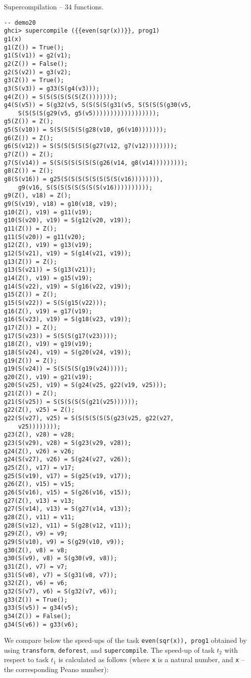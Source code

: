 Supercompilation -- 34 functions.
\begin{lstlisting}[style=demo,escapechar=!]
-- demo20
ghci> supercompile ({{even(sqr(x))}}, prog1)
g1(x)
g1(Z()) = True();
g1(S(v1)) = g2(v1);
g2(Z()) = False();
g2(S(v2)) = g3(v2);
g3(Z()) = True();
g3(S(v3)) = g33(S(g4(v3)));
g4(Z()) = S(S(S(S(S(S(Z()))))));
g4(S(v5)) = S(g32(v5, S(S(S(S(g31(v5, S(S(S(S(g30(v5, 
	S(S(S(S(g29(v5, g5(v5))))))))))))))))));
g5(Z()) = Z();
g5(S(v10)) = S(S(S(S(S(g28(v10, g6(v10)))))));
g6(Z()) = Z();
g6(S(v12)) = S(S(S(S(S(S(g27(v12, g7(v12))))))));
g7(Z()) = Z();
g7(S(v14)) = S(S(S(S(S(S(S(g26(v14, g8(v14)))))))));
g8(Z()) = Z();
g8(S(v16)) = g25(S(S(S(S(S(S(S(S(v16)))))))), 
	g9(v16, S(S(S(S(S(S(S(S(v16))))))))));
g9(Z(), v18) = Z();
g9(S(v19), v18) = g10(v18, v19);
g10(Z(), v19) = g11(v19);
g10(S(v20), v19) = S(g12(v20, v19));
g11(Z()) = Z();
g11(S(v20)) = g11(v20);
g12(Z(), v19) = g13(v19);
g12(S(v21), v19) = S(g14(v21, v19));
g13(Z()) = Z();
g13(S(v21)) = S(g13(v21));
g14(Z(), v19) = g15(v19);
g14(S(v22), v19) = S(g16(v22, v19));
g15(Z()) = Z();
g15(S(v22)) = S(S(g15(v22)));
g16(Z(), v19) = g17(v19);
g16(S(v23), v19) = S(g18(v23, v19));
g17(Z()) = Z();
g17(S(v23)) = S(S(S(g17(v23))));
g18(Z(), v19) = g19(v19);
g18(S(v24), v19) = S(g20(v24, v19));
g19(Z()) = Z();
g19(S(v24)) = S(S(S(S(g19(v24)))));
g20(Z(), v19) = g21(v19);
g20(S(v25), v19) = S(g24(v25, g22(v19, v25)));
g21(Z()) = Z();
g21(S(v25)) = S(S(S(S(S(g21(v25))))));
g22(Z(), v25) = Z();
g22(S(v27), v25) = S(S(S(S(S(S(g23(v25, g22(v27, 
	v25))))))));
g23(Z(), v28) = v28;
g23(S(v29), v28) = S(g23(v29, v28));
g24(Z(), v26) = v26;
g24(S(v27), v26) = S(g24(v27, v26));
g25(Z(), v17) = v17;
g25(S(v19), v17) = S(g25(v19, v17));
g26(Z(), v15) = v15;
g26(S(v16), v15) = S(g26(v16, v15));
g27(Z(), v13) = v13;
g27(S(v14), v13) = S(g27(v14, v13));
g28(Z(), v11) = v11;
g28(S(v12), v11) = S(g28(v12, v11));
g29(Z(), v9) = v9;
g29(S(v10), v9) = S(g29(v10, v9));
g30(Z(), v8) = v8;
g30(S(v9), v8) = S(g30(v9, v8));
g31(Z(), v7) = v7;
g31(S(v8), v7) = S(g31(v8, v7));
g32(Z(), v6) = v6;
g32(S(v7), v6) = S(g32(v7, v6));
g33(Z()) = True();
g33(S(v5)) = g34(v5);
g34(Z()) = False();
g34(S(v6)) = g33(v6);
\end{lstlisting}

We compare below the speed-ups of the task \texttt{{\color{brown}even(sqr(x))}, prog1}
obtained by using \texttt{transform}, \texttt{deforest}, and \texttt{supercompile}.
The speed-up of task $t_2$ with respect to task $t_1$ is calculated
as follows (where \texttt{x} is a natural number, and \texttt{{\color{brown}x}} -- the corresponding Peano number):

